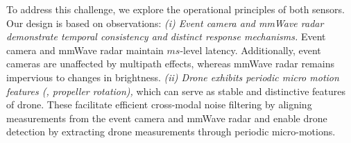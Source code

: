 
To address this challenge, we explore the operational principles of both sensors. 
Our design is based on observations: \textit{(i) Event camera and mmWave radar demonstrate temporal consistency and distinct response mechanisms.}
Event camera and mmWave radar maintain $ms$-level latency.
Additionally, event cameras are unaffected by multipath effects, whereas mmWave radar remains impervious to changes in brightness.
\textit{(ii) Drone exhibits periodic micro motion features (\eg, propeller rotation),} which can serve as stable and distinctive features of drone.
These facilitate efficient cross-modal noise filtering by aligning measurements from the event camera and mmWave radar and enable drone detection by extracting drone measurements through periodic micro-motions.




